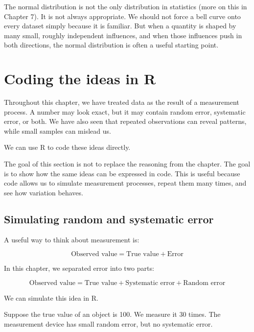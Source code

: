 \documentclass[
  letterpaper,
  DIV=11,
  numbers=noendperiod]{scrreprt}
\begin{document}
The normal distribution is not the only distribution in statistics (more
on this in Chapter 7). It is not always appropriate. We should not force
a bell curve onto every dataset simply because it is familiar. But when
a quantity is shaped by many small, roughly independent influences, and
when those influences push in both directions, the normal distribution
is often a useful starting point.

\section{Coding the ideas in R}\label{coding-the-ideas-in-r-2}

Throughout this chapter, we have treated data as the result of a
measurement process. A number may look exact, but it may contain random
error, systematic error, or both. We have also seen that repeated
observations can reveal patterns, while small samples can mislead us.

We can use R to code these ideas directly.

The goal of this section is not to replace the reasoning from the
chapter. The goal is to show how the same ideas can be expressed in
code. This is useful because code allows us to simulate measurement
processes, repeat them many times, and see how variation behaves.

\subsection{Simulating random and systematic
error}\label{simulating-random-and-systematic-error}

A useful way to think about measurement is:

\[
\text{Observed value} = \text{True value} + \text{Error}
\]

In this chapter, we separated error into two parts:

\[
\text{Observed value}
=
\text{True value}
+
\text{Systematic error}
+
\text{Random error}
\]

We can simulate this idea in R.

Suppose the true value of an object is 100. We measure it 30 times. The
measurement device has small random error, but no systematic error.
\end{document}
